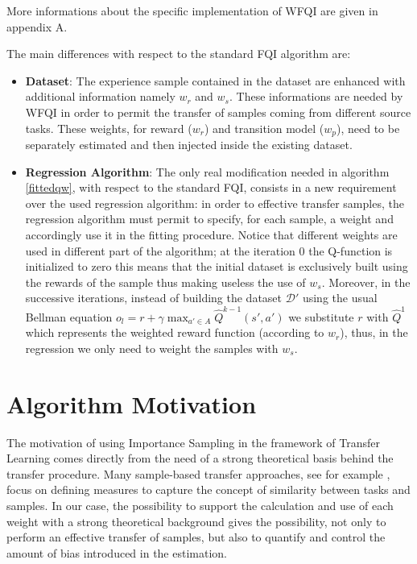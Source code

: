     \noindent More informations about the specific implementation of WFQI are given in appendix A.\newline

    \noindent The main differences with respect to the standard FQI algorithm are:
    \begin{itemize}
      \item \textbf{Dataset}: The experience sample contained in the dataset are enhanced with additional
        information namely $w_r$ and $w_s$. These informations are needed by WFQI in order to permit
        the transfer of samples coming from different source tasks. These weights, for reward ($w_r$) and
        transition model ($w_p$), need to be separately estimated and then injected inside the
        existing dataset.

      \item \textbf{Regression Algorithm}: The only real modification needed in algorithm \ref{fittedqw},
        with respect to the standard FQI, consists in a new requirement over the used
        regression algorithm: in order to effective transfer samples, the regression
        algorithm must permit to specify, for each sample, a weight and accordingly use
        it in the fitting procedure. Notice that different weights are used in different
        part of the algorithm; at the iteration 0 the Q-function is initialized to zero
        this means that the initial dataset is exclusively built using the rewards of the
        sample thus making useless the use of $w_s$. Moreover, in the successive iterations,
        instead of building the dataset $\mathcal{D}'$ using the usual Bellman equation
        $o_l = r + \gamma \max_{a' \in A} \hat{Q}^{k-1}(s',a')$ we substitute $r$ with $\hat{Q}^{1}$
        which represents the weighted reward function (according to $w_r$), thus, in the regression
        we only need to weight the samples with $w_s$.
    \end{itemize}

  \section{Algorithm Motivation}
    \noindent The motivation of using Importance Sampling in the framework of Transfer Learning comes directly
    from the need of a strong theoretical basis behind the transfer procedure. Many sample-based transfer approaches,
    see for example \cite{lazaric2008transfer}, focus on defining measures to capture the concept of similarity
    between tasks and samples. In our case, the possibility to support the calculation and use of each weight
    with a strong theoretical background gives the possibility, not only to perform an effective transfer of samples,
    but also to quantify and control the amount of bias introduced in the estimation.\newline

